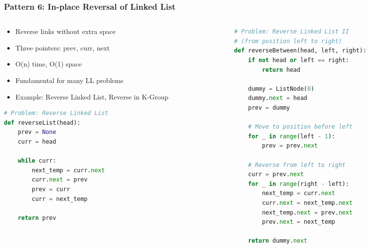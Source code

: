 \begin{frame}[fragile]\frametitle{Pattern 6: In-place Reversal of Linked List}
\begin{columns}
    \begin{column}[T]{0.5\linewidth}
      \begin{itemize}
        \item Reverse links without extra space
        \item Three pointers: prev, curr, next
        \item O(n) time, O(1) space
        \item Fundamental for many LL problems
        \item Example: Reverse Linked List, Reverse in K-Group
      \end{itemize}
	  
     \begin{lstlisting}[language=python, basicstyle=\tiny]
# Problem: Reverse Linked List
def reverseList(head):
    prev = None
    curr = head
    
    while curr:
        next_temp = curr.next
        curr.next = prev
        prev = curr
        curr = next_temp
    
    return prev
      \end{lstlisting}
	  
    \end{column}
    \begin{column}[T]{0.5\linewidth}
      \begin{lstlisting}[language=python, basicstyle=\tiny]
# Problem: Reverse Linked List II 
# (from position left to right)
def reverseBetween(head, left, right):
    if not head or left == right:
        return head
    
    dummy = ListNode(0)
    dummy.next = head
    prev = dummy
    
    # Move to position before left
    for _ in range(left - 1):
        prev = prev.next
    
    # Reverse from left to right
    curr = prev.next
    for _ in range(right - left):
        next_temp = curr.next
        curr.next = next_temp.next
        next_temp.next = prev.next
        prev.next = next_temp
    
    return dummy.next
      \end{lstlisting}

    \end{column}
  \end{columns}
\end{frame}

